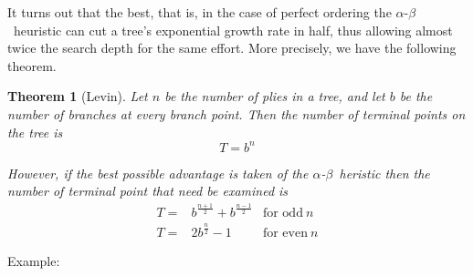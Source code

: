 \documentclass{tufte-handout}
\newcommand{\alphabeta}[0]{$\alpha$-$\beta$~}
\newtheorem{theorem}{Theorem}
\begin{document}
It turns out that the best, that is, in the case of perfect ordering the
\alphabeta heuristic can cut a tree's exponential growth rate in half, thus
allowing almost twice the search depth for the same effort. More precisely, we
have the following theorem.

\begin{theorem}[Levin]
  Let $n$ be the number of plies in a tree, and let $b$ be the number of
  branches at every branch point. Then the number of terminal points on the tree is
  $$T = b^n$$

  However, if the best possible advantage is taken of the \alphabeta heristic
  then the number of terminal point that need be examined is
  \begin{eqnarray*}
    T =& b^{\frac{n+1}{2}} + b^{\frac{n-1}{2}} &\text{for odd}~n\\
    T =& 2b^{\frac{n}{2}} - 1 &\text{for even}~n
  \end{eqnarray*}  
\end{theorem}

Example: %
\end{document}
